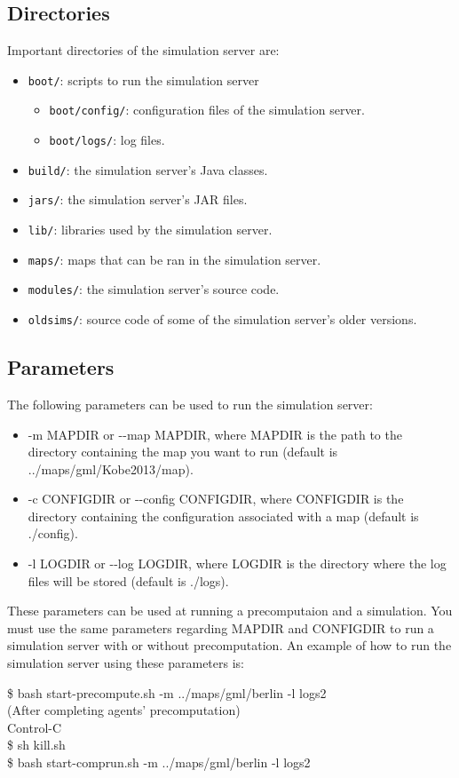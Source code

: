 \documentclass{article}
\begin{document}
\subsection{Directories}
Important directories of the simulation server are:
\begin{itemize}
 \item \texttt{boot/}: scripts to run the simulation server
       \begin{itemize}
         \item \texttt{boot/config/}: configuration files of the simulation server.
         \item \texttt{boot/logs/}: log files.
       \end{itemize}
 \item \texttt{build/}: the simulation server's Java classes.
 \item \texttt{jars/}: the simulation server's JAR files.
 \item \texttt{lib/}: libraries used by the simulation server.
 \item \texttt{maps/}: maps that can be ran in the simulation server.
 \item \texttt{modules/}: the simulation server's source code.
 \item \texttt{oldsims/}: source code of some of the simulation server's older versions.
\end{itemize}
\subsection{Parameters}
The following parameters can be used to run the simulation server:
\begin{itemize}
  \item -m MAPDIR or {-}{-}map MAPDIR, where MAPDIR is the path to the directory containing the map you want to run (default is ../maps/gml/Kobe2013/map).
  \item -c CONFIGDIR or {-}{-}config CONFIGDIR, where CONFIGDIR is the directory containing the configuration associated with a map (default is ./config).
  \item -l LOGDIR or {-}{-}log LOGDIR, where LOGDIR is the directory where the log files will be stored (default is ./logs).
\end{itemize}

These parameters can be used at running a precomputaion and a simulation. You must use the same parameters regarding MAPDIR and CONFIGDIR to run a simulation server with or without precomputation. An example of how to run the simulation server using these parameters is:
\begin{center}
   \begin{tcolorbox}[title=Running Simulation Server with Options, width=.98\linewidth]
    {\ttfamily
    \$ bash start-precompute.sh -m ../maps/gml/berlin -l logs2\\
    (After completing agents' precomputation)\\
    Control-C\\
    \$ sh kill.sh\\
    \$ bash start-comprun.sh -m ../maps/gml/berlin -l logs2
    }
  \end{tcolorbox}
\end{center}
\end{document}
